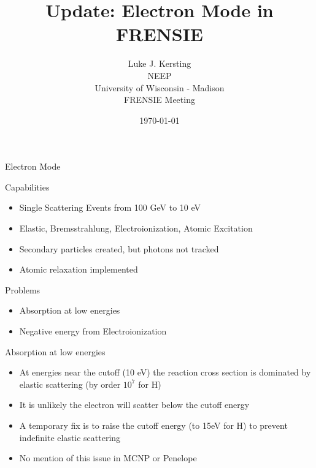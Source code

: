 \documentclass{beamer}
\author{Luke J. Kersting
    \\ NEEP
    \\ University of Wisconsin - Madison
    \\ FRENSIE Meeting
}
\date{\today}
\title{Update: Electron Mode in FRENSIE}
\begin{document}
\maketitle

\begin{frame}{Electron Mode}

  \begin{block}{Capabilities}
    \begin{itemize}
      \item Single Scattering Events from 100 GeV to 10 eV
      \item Elastic, Bremsstrahlung, Electroionization, Atomic Excitation 
      \item Secondary particles created, but photons not tracked
      \item Atomic relaxation implemented
    \end{itemize}
  \end{block}
    
  \begin{block}{Problems}
    \begin{itemize}
      \item Absorption at low energies
      \item Negative energy from Electroionization
    \end{itemize}    
  \end{block}  

\end{frame}

\begin{frame}{Absorption at low energies}

  \begin{itemize}
    \item At energies near the cutoff (10 eV) the reaction cross section is dominated by elastic scattering (by order $10^7$ for H)
    \item It is unlikely the electron will scatter below the cutoff energy 
    \item A temporary fix is to raise the cutoff energy (to 15eV for H) to prevent indefinite elastic scattering
    \item No mention of this issue in MCNP or Penelope 
  \end{itemize}

\end{frame}
\end{document}
